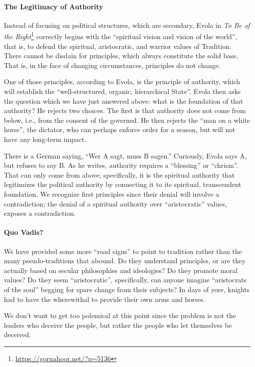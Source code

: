 \paragraph{The Legitimacy of Authority}

Instead of focusing on political structures, which are secondary, Evola in \textit{To Be of the Right}\footnote{\url{https://gornahoor.net/?p=5136}} correctly begins with the ``spiritual vision and vision of the world'', that is, to defend the spiritual, aristocratic, and warrior values of Tradition. There cannot be disdain for principles, which always constitute the solid base. That is, in the face of changing circumstances, principles do not change.

One of those principles, according to Evola, is the principle of authority, which will establish the ``well-structured, organic, hierarchical State''. Evola then asks the question which we have just answered above: what is the foundation of that authority? He rejects two choices. The first is that authority does not come from below, i.e., from the consent of the governed. He then rejects the ``man on a white horse'', the dictator, who can perhaps enforce order for a season, but will not have any long-term impact.

There is a German saying, ``Wer A sagt, muss B sagen.'' Curiously, Evola says A, but refuses to say B. As he writes, authority requires a ``blessing'' or ``chrism''. That can only come from above; specifically, it is the spiritual authority that legitimizes the political authority by connecting it to its spiritual, transcendent foundation. We recognize first principles since their denial will involve a contradiction; the denial of a spiritual authority over ``aristocratic'' values, exposes a contradiction.

\paragraph{Quo Vadis?}


We have provided some more ``road signs'' to point to tradition rather than the many pseudo-traditions that abound. Do they understand principles, or are they actually based on secular philosophies and ideologies? Do they promote moral values? Do they seem ``aristocratic'', specifically, can anyone imagine ``aristocrats of the soul'' begging for spare change from their subjects? In days of yore, knights had to have the wherewithal to provide their own arms and horses.

We don't want to get too polemical at this point since the problem is not the leaders who deceive the people, but rather the people who let themselves be deceived.


